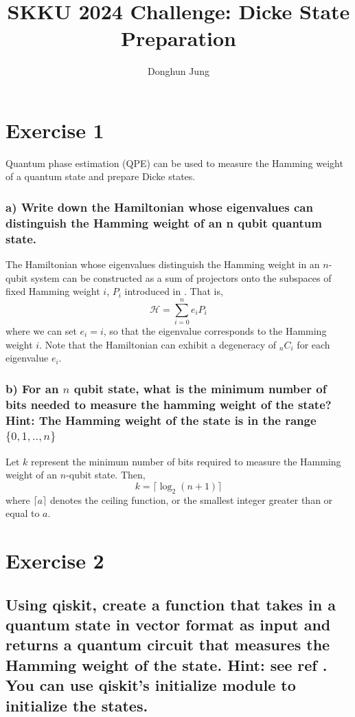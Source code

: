 \documentclass[a4paper, 11pt]{article}
\begin{document}
\title{SKKU 2024 Challenge: Dicke State Preparation}
\author{Donghun Jung}
\maketitle

\section*{Exercise 1}
Quantum phase estimation (QPE) can be used to measure the Hamming weight of a quantum state and prepare Dicke states.

\subsubsection*{a) Write down the Hamiltonian whose eigenvalues can distinguish the Hamming weight of an n qubit quantum state.}

The Hamiltonian whose eigenvalues distinguish the Hamming weight in an $n$-qubit system can be constructed as a sum of projectors onto the subspaces of fixed Hamming weight $i$, $P_{i}$ introduced in \cite{rethinasamy2024logarithmicdepthquantumcircuitshamming}. That is,
\begin{equation}
	\mathcal{H} = \sum_{i=0}^{n} e_i P_{i}
\end{equation}
where we can set $e_i = i$, so that the eigenvalue corresponds to the Hamming weight $i$. 
Note that the Hamiltonian can exhibit a degeneracy of ${}_{n}C_i$ for each eigenvalue $e_i$.

\subsubsection*{b) For an $n$ qubit state, what is the minimum number of bits needed to measure the hamming weight of the state? Hint: The Hamming weight of the state is in the range $\{0,1,..,n\}$}
Let $k$ represent the minimum number of bits required to measure the Hamming weight of an $n$-qubit state. Then,
\begin{equation}
	k = \lceil\log_{2}(n+1)\rceil
\end{equation}
where $\lceil a \rceil$ denotes the ceiling function, or the smallest integer greater than or equal to $a$.

\section*{Exercise 2}
\subsection*{
    Using qiskit, create a function that takes in a quantum state in vector format as input and returns a quantum circuit that measures the Hamming weight of the state. Hint: see ref \cite{rethinasamy2024logarithmicdepthquantumcircuitshamming}. You can use qiskit's initialize module to initialize the states.
}
\end{document}
